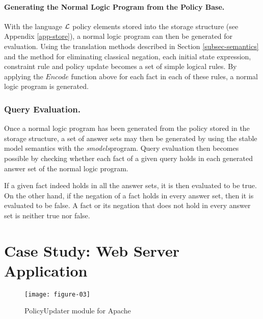 \documentclass[global,twocolumn,final]{svjour}
\begin{document}
        \paragraph{Generating the Normal Logic Program from the Policy Base.}

          With the language ${\cal L}$ policy elements stored into the storage
          structure (see Appendix \ref{app-store}), a normal logic program can
          then be generated for evaluation. Using the translation methods
          described in Section \ref{subsec-semantics} and the method for
          eliminating classical negation, each initial state expression,
          constraint rule and policy update becomes a set of simple logical
          rules. By applying the $Encode$ function above for each fact in each
          of these rules, a normal logic program is generated.

      \subsubsection{Query Evaluation.}

        Once a normal logic program has been generated from the policy stored
        in the storage structure, a set of answer sets may then be generated
        by using the stable model semantics \cite{SIM} with the
        {\em smodels}\footnotemark program. Query evaluation then becomes
        possible by checking whether each fact of a given query holds in each
        generated answer set of the normal logic program.


        If a given fact indeed holds in all the answer sets, it is then
        evaluated to be true. On the other hand, if the negation of a fact
        holds in every answer set, then it is evaluated to be false. A fact
        or its negation that does not hold in every answer set is neither true
        nor false.

  \section{Case Study: Web Server Application}
    \label{sec-case}

    \begin{figure}[ht]
      \begin{center}
        \texttt{[image: figure-03]}
        \caption{PolicyUpdater module for Apache}
        \label{fig-3}
      \end{center}
    \end{figure}
\end{document}
